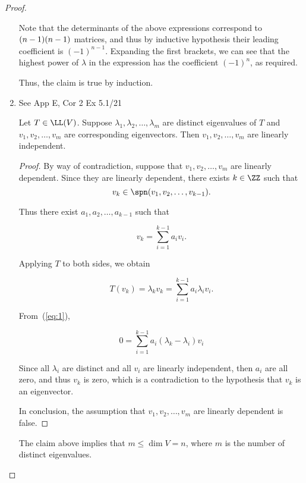 \documentclass[11pt]{scrartcl}
\begin{document}
\begin{proof}
\begin{enumerate}[label=\alph*)]
Note that the determinants of the above expressions correspond to
\((n-1)\*(n-1)\) matrices, and thus by inductive hypothesis their
leading coefficient is \((-1)^{n-1}\). Expanding the first brackets,
we can see that the highest power of \(\lambda\) in the expression has
the coefficient \((-1)^{n}\), as required.

Thus, the claim is true by induction.

\item

  \begin{note*}
    See App E, Cor 2
    Ex 5.1/21
  \end{note*}

  \begin{claim*}
    Let \(T\in\LL(V)\). Suppose
    \(\lambda_{1}, \lambda_{2}, \dots, \lambda_{m}\) are distinct
    eigenvalues of \(T\) and \(v_{1}, v_{2}, \dots, v_{m}\) are
    corresponding eigenvectors. Then \(v_{1}, v_{2}, \dots, v_{m}\)
    are linearly independent.
  \end{claim*}

  \begin{proof}
    By way of contradiction, suppose that
    \(v_{1}, v_{2}, \dots, v_{m}\) are linearly dependent. Since they
    are linearly dependent, there exists \(k\in\ZZ\) such that
    \[v_{k}\in\spn(v_{1}, v_{2}, \dots, v_{k-1}).\]

    Thus there exist \(a_{1}, a_{2}, \dots, a_{k-1}\) such that

    \begin{equation}
      \label{eq:1}
      v_{k} = \sum_{i=1}^{k-1}a_{i}v_{i}.
    \end{equation}

    Applying \(T\) to both sides, we obtain

    \begin{equation*}
      T(v_{k}) = \lambda_{k}v_{k} =  \sum_{i=1}^{k-1}a_{i}\lambda_{i}v_{i}.
    \end{equation*}

    From~(\ref{eq:1}),

    \begin{equation*}
      0 =  \sum_{i=1}^{k-1}a_{i}(\lambda_{k} - \lambda_{i})v_{i}
    \end{equation*}

    Since all \(\lambda_{i}\) are distinct and all \(v_{i}\) are
    linearly independent, then \(a_{i}\) are all zero, and thus
    \(v_{k}\) is zero, which is a contradiction to the hypothesis that
    \(v_{k}\) is an eigenvector.

    In conclusion, the assumption that \(v_{1}, v_{2}, \dots, v_{m}\) are
    linearly dependent is false.
  \end{proof}

  The claim above implies that \(m\leq\dim V = n\), where \(m\) is the
  number of distinct eigenvalues.
\end{enumerate}
\end{proof}
\end{document}
